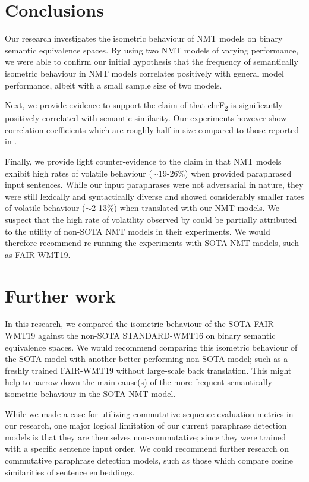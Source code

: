 \documentclass[11pt,a4paper]{article}
\begin{document}
\section{Conclusions}

Our research investigates the isometric behaviour of NMT models on binary
semantic equivalence spaces. By using two NMT models of varying performance, we
were able to confirm our initial hypothesis that the frequency of semantically
isometric behaviour in NMT models correlates positively with general model
performance, albeit with a small sample size of two models.

Next, we provide evidence to support the claim of \citet{michel2019evaluation}
that chrF\textsubscript{2} is significantly positively correlated with semantic
similarity. Our experiments however show correlation coefficients which are
roughly half in size compared to those reported in \citet{michel2019evaluation}.

Finally, we provide light counter-evidence to the claim in
\citet{fadaee2020unreasonable} that NMT models exhibit high rates of volatile
behaviour ($\sim$19-26$\%$) when provided paraphrased input sentences. While our
input paraphrases were not adversarial in nature, they were still lexically and
syntactically diverse and showed considerably smaller rates of volatile
behaviour ($\sim$2-13$\%$) when translated with our NMT models. We suspect that
the high rate of volatility observed by \citet{fadaee2020unreasonable} could be
partially attributed to the utility of non-SOTA NMT models in their experiments.
We would therefore recommend re-running the experiments with SOTA NMT models,
such as FAIR-WMT19.

\section{Further work}

In this research, we compared the isometric behaviour of the SOTA FAIR-WMT19
against the non-SOTA STANDARD-WMT16 on binary semantic equivalence spaces. We
would recommend comparing this isometric behaviour of the SOTA model with
another better performing non-SOTA model; such as a freshly trained FAIR-WMT19
without large-scale back translation. This might help to narrow down the main
cause(s) of the more frequent semantically isometric behaviour in the SOTA NMT
model.

While we made a case for utilizing commutative sequence evaluation metrics in
our research, one major logical limitation of our current paraphrase detection
models is that they are themselves non-commutative; since they were trained with
a specific sentence input order. We could recommend further research on
commutative paraphrase detection models, such as those which compare cosine
similarities of sentence embeddings.
\end{document}
